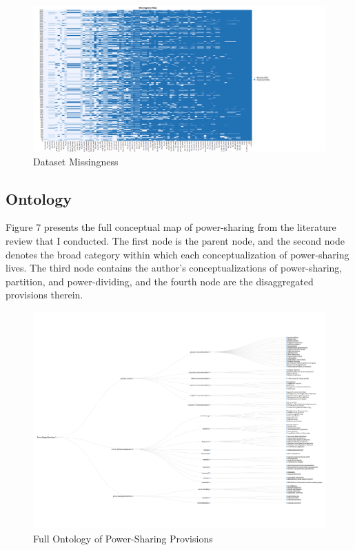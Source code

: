 \documentclass[12pt]{article}
\begin{document}
\begin{figure}[!htbp]
	\begin{center}
		\includegraphics[width = 8in]{tjbrailey_psp_clean_missingness.png}
	\end{center}
	\caption{Dataset Missingness}
\end{figure}

\subsection{Ontology}

Figure 7 presents the full conceptual map of power-sharing from the literature review that I conducted. The first node is the parent node, and the second node denotes the broad category within which each conceptualization of power-sharing lives. The third node contains the author's conceptualizations of power-sharing, partition, and power-dividing, and the fourth node are the disaggregated provisions therein. 

\begin{figure}
	\includegraphics[width = 9.5in]{psp_ontology_vis.png}
	\caption{Full Ontology of Power-Sharing Provisions}
\end{figure}
\end{document}
